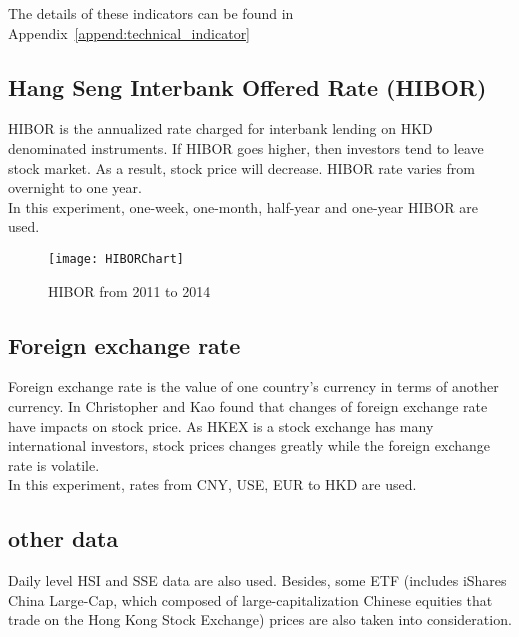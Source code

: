 The details of these indicators can be found in Appendix~\ref{append:technical_indicator}

\subsection{Hang Seng Interbank Offered Rate (HIBOR)}
HIBOR is the annualized rate charged for interbank lending on HKD denominated instruments\cite{chen2010principal}. If HIBOR goes higher, then investors tend to leave stock market. As a result, stock price will decrease. HIBOR rate varies from overnight to one year. \\



In this experiment, one-week, one-month, half-year and one-year HIBOR are used. 

\begin{figure}[h]
	\centering
	\texttt{[image: HIBORChart]}
	\caption{HIBOR from 2011 to 2014}
\end{figure}



\subsection{Foreign exchange rate}
Foreign exchange rate is the value of one country’s currency in terms of another currency. In \cite{ma1990exchange} Christopher and Kao found that changes of foreign exchange rate have impacts on stock price. As HKEX is a stock exchange has many international investors, stock prices changes greatly while the foreign exchange rate is volatile.\\


In this experiment, rates from CNY, USE, EUR to HKD are used.

\subsection{other data}
Daily level HSI and SSE data are also used. Besides, some ETF (includes iShares China Large-Cap, which composed of large-capitalization Chinese equities that trade on the Hong Kong Stock Exchange) prices are also taken into consideration.
